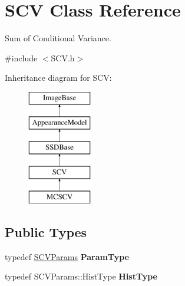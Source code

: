 \hypertarget{classSCV}{\section{S\-C\-V Class Reference}
\label{classSCV}
}


Sum of Conditional Variance.  




{\ttfamily \#include $<$S\-C\-V.\-h$>$}

Inheritance diagram for S\-C\-V\-:\begin{figure}[H]
\begin{center}
\leavevmode
\includegraphics[height=5.000000cm]{classSCV}
\end{center}
\end{figure}
\subsection*{Public Types}
\begin{DoxyCompactItemize}
\item 
\hypertarget{classSCV_a6ef2c44672ea8b08cad884cb349dd00b}{typedef \hyperlink{structSCVParams}{S\-C\-V\-Params} {\bfseries Param\-Type}}\label{classSCV_a6ef2c44672ea8b08cad884cb349dd00b}

\item 
\hypertarget{classSCV_a09d9a8cfc89de577f4ac6bea7234d4fc}{typedef S\-C\-V\-Params\-::\-Hist\-Type {\bfseries Hist\-Type}}\label{classSCV_a09d9a8cfc89de577f4ac6bea7234d4fc}

\end{DoxyCompactItemize}
